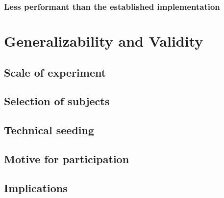 \subsubsection{Less performant than the established implementation}

\section{Generalizability and Validity}

\subsection{Scale of experiment}


\subsection{Selection of subjects}


\subsection{Technical seeding}


\subsection{Motive for participation}


\subsection{Implications}

